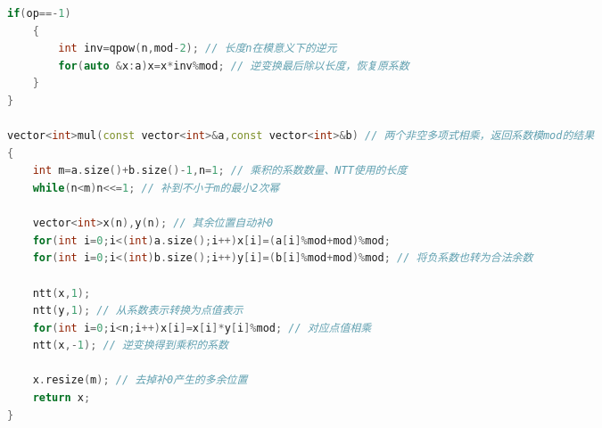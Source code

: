 \documentclass[10pt,landscape,a4paper]{article}
\begin{document}
\begin{multicols*}{3}
\begin{lstlisting}[language=C++]
    if(op==-1)
    {
        int inv=qpow(n,mod-2); // 长度n在模意义下的逆元
        for(auto &x:a)x=x*inv%mod; // 逆变换最后除以长度，恢复原系数
    }
}

vector<int>mul(const vector<int>&a,const vector<int>&b) // 两个非空多项式相乘，返回系数模mod的结果
{
    int m=a.size()+b.size()-1,n=1; // 乘积的系数数量、NTT使用的长度
    while(n<m)n<<=1; // 补到不小于m的最小2次幂

    vector<int>x(n),y(n); // 其余位置自动补0
    for(int i=0;i<(int)a.size();i++)x[i]=(a[i]%mod+mod)%mod;
    for(int i=0;i<(int)b.size();i++)y[i]=(b[i]%mod+mod)%mod; // 将负系数也转为合法余数

    ntt(x,1);
    ntt(y,1); // 从系数表示转换为点值表示
    for(int i=0;i<n;i++)x[i]=x[i]*y[i]%mod; // 对应点值相乘
    ntt(x,-1); // 逆变换得到乘积的系数

    x.resize(m); // 去掉补0产生的多余位置
    return x;
}
\end{lstlisting}

\end{multicols*}
\end{document}
